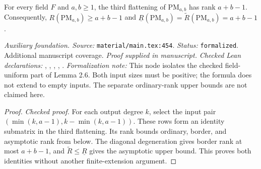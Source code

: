\renewcommand{\thetheorem}{A63}
\begin{lemma}
\label{aux:polynomial-multiplication-ranks}
\manuscriptproof
{}
\leanok
{}
For every field $F$ and $a,b\ge1$, the third flattening of $\mathrm{PM}_{a,b}$ has rank $a+b-1$. Consequently, $R(\mathrm{PM}_{a,b})\ge a+b-1$ and $\underline R(\mathrm{PM}_{a,b})=\widetilde R(\mathrm{PM}_{a,b})=a+b-1$.
\end{lemma}

\noindent\textit{Auxiliary foundation. Source:} \texttt{material/main.tex:454}.
\textit{Status:} \texttt{formalized}. Additional manuscript coverage.
\textit{Proof supplied in manuscript.}
\textit{Checked Lean declarations:} , , , , .
\textit{Formalization note:} This node isolates the checked field-uniform part of Lemma 2.6. Both input sizes must be positive; the formula does not extend to empty inputs. The separate ordinary-rank upper bounds are not claimed here.

\begin{proof}
\leanok
{}
\textit{Checked proof.} For each output degree $k$, select the input pair $(\min(k,a-1),k-\min(k,a-1))$. These rows form an identity submatrix in the third flattening. Its rank bounds ordinary, border, and asymptotic rank from below. The diagonal degeneration gives border rank at most $a+b-1$, and $\widetilde R\le\underline R$ gives the asymptotic upper bound. This proves both identities without another finite-extension argument.
\end{proof}

